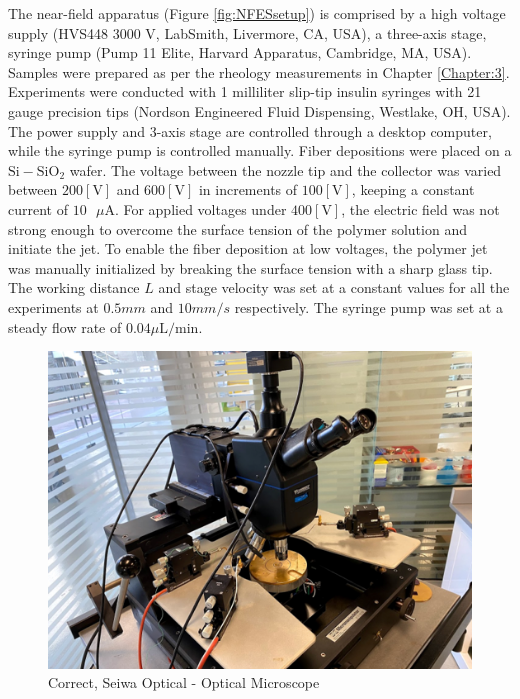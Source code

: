 The near-field apparatus (Figure \ref{fig:NFESsetup}) is comprised by a high voltage supply (HVS448 3000 V, LabSmith, Livermore, CA, USA), a three-axis stage, syringe pump (Pump 11 Elite, Harvard Apparatus, Cambridge, MA, USA). Samples were prepared as per the rheology measurements in Chapter \ref{Chapter:3}. Experiments were conducted with 1 milliliter slip-tip insulin syringes with 21 gauge precision tips (Nordson Engineered Fluid Dispensing, Westlake, OH, USA). The power supply and 3-axis stage are controlled through a desktop computer, while the syringe pump is controlled manually. Fiber depositions were placed on a $\textrm{Si}-\textrm{SiO}_2$ wafer. The voltage between the nozzle tip and the collector was varied between $200 [\textrm{V}]$ and $600 [\textrm{V}]$ in increments of $100 [\textrm{V}]$, keeping a constant current of $10 \textrm{ } \mu \textrm{A}$. For applied voltages under $400 [\textrm{V}]$, the electric field was not strong enough to overcome the surface tension of the polymer solution and initiate the jet. To enable the fiber deposition at low voltages, the polymer jet was manually initialized by breaking the surface tension with a sharp glass tip. The working distance $L$ and stage velocity was set at a constant values for all the experiments at $0.5 mm$ and $10 mm/s$ respectively. The syringe pump was set at a steady flow rate of $0.04 \mu \textrm{L} / \textrm{min}$.

\begin{figure}[!th]
\centering
\includegraphics[scale=0.50]{./Figures/microscope.png}
\decoRule
\caption{Correct, Seiwa Optical - Optical Microscope}
\label{fig:microscope}
\end{figure}

